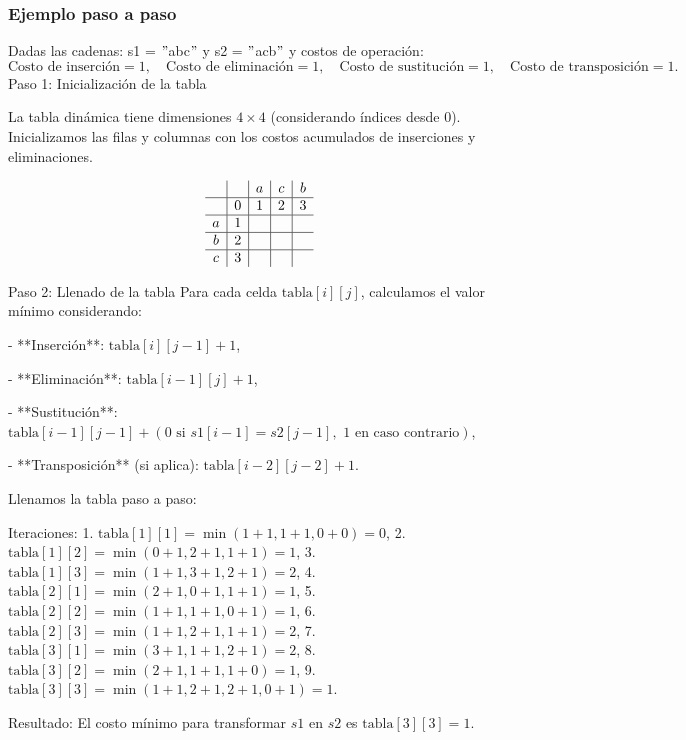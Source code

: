 \subsubsection{Ejemplo paso a paso}
Dadas las cadenas: s1 = $"$abc$"$ y s2 = $"$acb$"$
y costos de operación:
\[
\text{Costo de inserción} = 1, \quad \text{Costo de eliminación} = 1, \quad \text{Costo de sustitución} = 1, \quad \text{Costo de transposición} = 1.
\]
Paso 1: Inicialización de la tabla

La tabla dinámica tiene dimensiones \( 4 \times 4 \) (considerando índices desde 0). Inicializamos las filas y columnas con los costos acumulados de inserciones y eliminaciones.

\[
\begin{array}{c|c|c|c|c}
    &   & a & c & b \\
    \hline
    & 0 & 1 & 2 & 3 \\
    \hline
    a & 1 &   &   &   \\
    \hline
    b & 2 &   &   &   \\
    \hline
    c & 3 &   &   &   \\
\end{array}
\]

Paso 2: Llenado de la tabla
Para cada celda \( \text{tabla}[i][j] \), calculamos el valor mínimo considerando:

- **Inserción**: \( \text{tabla}[i][j-1] + 1 \),

- **Eliminación**: \( \text{tabla}[i-1][j] + 1 \),

- **Sustitución**: \( \text{tabla}[i-1][j-1] + (0 \text{ si } s1[i-1] = s2[j-1], \text{ 1 en caso contrario}) \),

- **Transposición** (si aplica): \( \text{tabla}[i-2][j-2] + 1 \).

Llenamos la tabla paso a paso:

Iteraciones:
1. \( \text{tabla}[1][1] = \min(1 + 1, 1 + 1, 0 + 0) = 0 \),  
2. \( \text{tabla}[1][2] = \min(0 + 1, 2 + 1, 1 + 1) = 1 \),  
3. \( \text{tabla}[1][3] = \min(1 + 1, 3 + 1, 2 + 1) = 2 \),  
4. \( \text{tabla}[2][1] = \min(2 + 1, 0 + 1, 1 + 1) = 1 \), 
5. \( \text{tabla}[2][2] = \min(1 + 1, 1 + 1, 0 + 1) = 1 \),  
6. \( \text{tabla}[2][3] = \min(1 + 1, 2 + 1, 1 + 1) = 2 \),  
7. \( \text{tabla}[3][1] = \min(3 + 1, 1 + 1, 2 + 1) = 2 \),  
8. \( \text{tabla}[3][2] = \min(2 + 1, 1 + 1, 1 + 0) = 1 \),  
9. \( \text{tabla}[3][3] = \min(1 + 1, 2 + 1, 2 + 1, 0 + 1) = 1 \).

Resultado:
El costo mínimo para transformar \( s1 \) en \( s2 \) es \( \text{tabla}[3][3] = 1 \).



